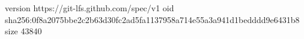 version https://git-lfs.github.com/spec/v1
oid sha256:0f8a2075bbe2c2b63d30fc2ad5fa1137958a714e55a3a941d1bedddd9e6431b8
size 43840
